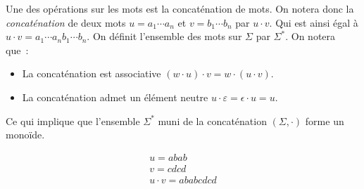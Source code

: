 \begin{definition}
    Une des opérations sur les mots est la concaténation de mots. On notera
    donc la \textit{concaténation} de deux mots \(u = a_1 \cdots a_n\) et \(v =
    b_1 \cdots b_n\) par \(u \cdot v\). Qui est ainsi égal à \(u \cdot v = a_1
    \cdots a_n b_1 \cdots b_n\). On définit l'ensemble des mots sur \(\Sigma\)
    par \(\Sigma ^ *\). On notera que~:

    \begin{itemize}[label=\textbullet]
        \item La concaténation est associative \((w \cdot u) \cdot v = w \cdot
              (u \cdot v)\).
        \item La concaténation admet un élément neutre \(u \cdot \varepsilon =
              \epsilon \cdot u = u\).
    \end{itemize}

    \noindent Ce qui implique que l'ensemble \(\Sigma ^ *\) muni de la concaténation
    \((\Sigma, \cdot)\) forme un monoïde.
\end{definition}

\begin{example}
    \begin{gather*}
        u = abab \\
        v = cdcd \\
        u \cdot v = ababcdcd
    \end{gather*}
\end{example}



